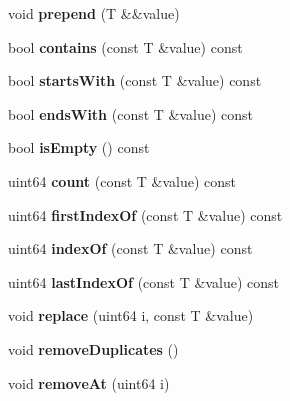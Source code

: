 \begin{DoxyCompactItemize}
void {\bfseries prepend} (T \&\&value)
\item 
\mbox{\label{class_a_list_ab3db4e8f60d5abf4e7a12d928fb244a0}} 
bool {\bfseries contains} (const T \&value) const
\item 
\mbox{\label{class_a_list_ac6b1d6dabb7177aa465019860aeacba1}} 
bool {\bfseries starts\+With} (const T \&value) const
\item 
\mbox{\label{class_a_list_af6383e2209b2baa7c0e602b82d586cf9}} 
bool {\bfseries ends\+With} (const T \&value) const
\item 
\mbox{\label{class_a_list_ab0c4bd9783b1a181471e05f9fda79138}} 
bool {\bfseries is\+Empty} () const
\item 
\mbox{\label{class_a_list_a080adc45c0ae48857fbc0a6ef5d18b7d}} 
uint64 {\bfseries count} (const T \&value) const
\item 
\mbox{\label{class_a_list_a9cba56b6076ef86c44e42f4221d80421}} 
uint64 {\bfseries first\+Index\+Of} (const T \&value) const
\item 
\mbox{\label{class_a_list_ae4fb007041bc433557e301794b761386}} 
uint64 {\bfseries index\+Of} (const T \&value) const
\item 
\mbox{\label{class_a_list_a67fa7988c05a3e5ef971ca6af77b2381}} 
uint64 {\bfseries last\+Index\+Of} (const T \&value) const
\item 
\mbox{\label{class_a_list_a745c812c22b1a3a8efdbe82eafd86f4b}} 
void {\bfseries replace} (uint64 i, const T \&value)
\item 
\mbox{\label{class_a_list_a33f188595f0da046cced105c2e441506}} 
void {\bfseries remove\+Duplicates} ()
\item 
\mbox{\label{class_a_list_a4c5d1f1c0c6c8da99ac6279f1fea6a88}} 
void {\bfseries remove\+At} (uint64 i)
\item 
\mbox{\label{class_a_list_ada980037299e3dcbf05b50977216f32d}} 

\end{DoxyCompactItemize}
